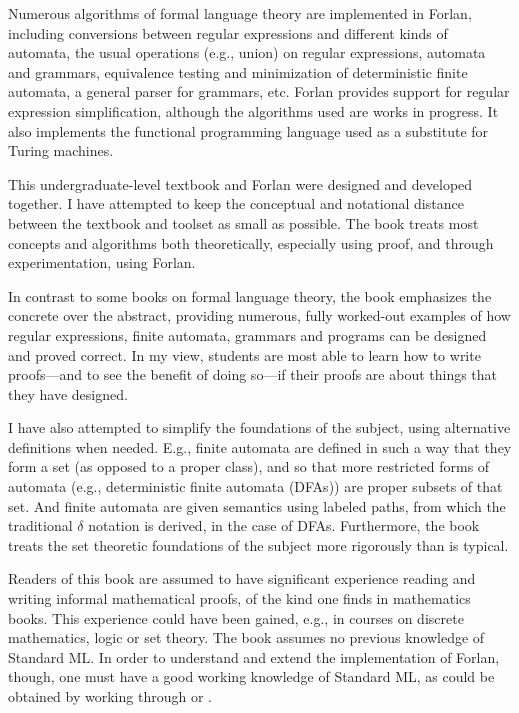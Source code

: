 Numerous algorithms of formal language theory are implemented in
Forlan, including conversions between regular expressions and
different kinds of automata, the usual operations (e.g., union) on
regular expressions, automata and grammars, equivalence testing and
minimization of deterministic finite automata, a general parser for
grammars, etc.  Forlan provides support for regular expression
simplification, although the algorithms used are works in progress.
It also implements the functional programming language used as a
substitute for Turing machines.

This undergraduate-level textbook and Forlan were designed and
developed together.  I have attempted to keep the conceptual and
notational distance between the textbook and toolset as small as
possible.  The book treats most concepts and algorithms both
theoretically, especially using proof, and through experimentation,
using Forlan.

In contrast to some books on formal language theory, the book
emphasizes the concrete over the abstract, providing numerous, fully
worked-out examples of how regular expressions, finite automata,
grammars and programs can be designed and proved correct.  In my view,
students are most able to learn how to write proofs---and to see the
benefit of doing so---if their proofs are about things that they have
designed.

I have also attempted to simplify the foundations of the subject,
using alternative definitions when needed. E.g., finite automata are
defined in such a way that they form a set (as opposed to a proper
class), and so that more restricted forms of automata (e.g.,
deterministic finite automata (DFAs)) are proper subsets of that
set. And finite automata are given semantics using labeled paths, from
which the traditional $\delta$ notation is derived, in the case of
DFAs. Furthermore, the book treats the set theoretic foundations of
the subject more rigorously than is typical.

Readers of this book are assumed to have significant experience
reading and writing informal mathematical proofs, of the kind one
finds in mathematics books.  This experience could have been gained,
e.g., in courses on discrete mathematics, logic or set theory.  The
book assumes no previous knowledge of Standard ML.  In order to
understand and extend the implementation of Forlan, though, one must
have a good working knowledge of Standard ML, as could be obtained by
working through \cite{Paulson96} or \cite{Ullman98}.

